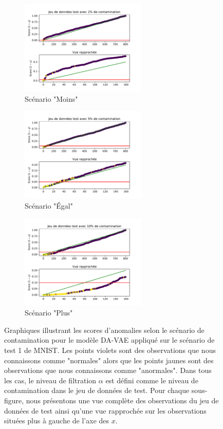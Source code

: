 \begin{figure}[H]
	\centering
	\begin{subfigure}{6cm}
		\centering\includegraphics[width=6cm]{images/images_davae/pvalues_scenario3_moins}
		\caption{Scénario "Moins"}
	\end{subfigure}
	\begin{subfigure}{6cm}
		\centering\includegraphics[width=6cm]{images/images_davae/pvalues_scenario3_egal}
		\caption{Scénario "Égal"}
	\end{subfigure}
	\begin{subfigure}{6cm}
		\centering\includegraphics[width=6cm]{images/images_davae/pvalues_scenario3_plus}
		\caption{Scénario "Plus"}
	\end{subfigure}
	\caption{Graphiques illustrant les scores d'anomalies selon le scénario de contamination pour le modèle DA-VAE appliqué sur le scénario de test 1 de MNIST. Les points violets sont des observations que nous connaissons comme "normales" alors que les points jaunes sont des observations que nous connaissons comme "anormales". Dans tous les cas, le niveau de filtration $\alpha$ est défini comme le niveau de contamination dans le jeu de données de test. Pour chaque sous-figure, nous présentons une vue complète des observations du jeu de données de test ainsi qu'une vue rapprochée sur les observations situées plus à gauche de l'axe des $x$.}
	\label{fig:pvalues_scenarios_mnist}
\end{figure}

